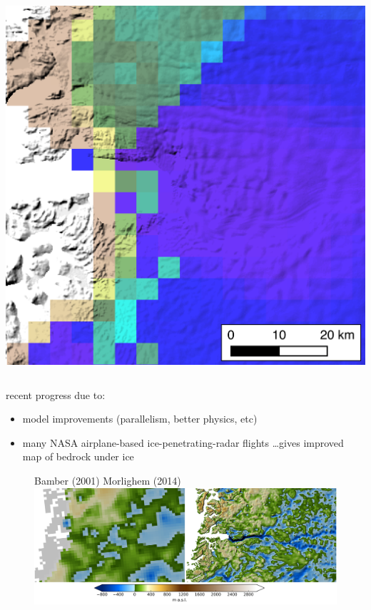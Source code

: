 \documentclass[hide notes,intlimits]{beamer}
\begin{document}
\begin{frame}[plain]
\begin{columns}
\medskip
    \includegraphics[width=\textwidth]{jakobshavn-speed-exp-4500m-ba01}
  \end{columns}
\end{frame}


\begin{frame}[plain]

\phantom{foo}

recent progress due to:

\begin{itemize}
\item model improvements (parallelism, better physics, etc)
\item many NASA airplane-based ice-penetrating-radar flights \dots gives improved map of bedrock under ice
\end{itemize}

  \begin{figure}
    \small{Bamber (2001) \hspace{7em} Morlighem (2014)}
    \includegraphics[width=12cm]{jako_bed}
 \end{figure}
\end{frame}
\end{document}
